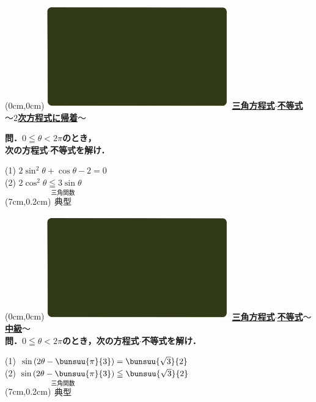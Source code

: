 \documentclass[10pt,
fleqn,
dvipdfmx,
uplatex
]{jsarticle}
\begin{document}
\at(0cm,0cm){\includegraphics[width=8cm,bb=0 0 1920 1080]{./youtube/thumbnails/templates/smart_background/三角関数.jpeg}}
{\color{orange}\bf\boldmath\normalsize\underline{三角方程式$\cdot$不等式$〜2$次方程式に帰着$〜$}}\vspace{0.3zw}

\large 
\bf\boldmath 問．$0\leqq \theta <2\pi$のとき，\\
\hfill 次の方程式$\cdot$不等式を解け．

\LARGE
(1)  $2\sin ^2\theta +\cos \theta -2=0$\\
(2)  $2\cos ^2\theta \leqq 3\sin \theta$\\

\at(7cm,0.2cm){\small\color{bradorange}$\overset{\text{三角関数}}{\text{典型}}$}

\newpage

\at(0cm,0cm){\includegraphics[width=8cm,bb=0 0 1920 1080]{./youtube/thumbnails/templates/smart_background/三角関数.jpeg}}
{\color{orange}\bf\boldmath\Large\underline{三角方程式$\cdot$不等式$〜$中級$〜$}}\vspace{0.3zw}\\
\small 
\bf\boldmath 問．$0\leqq \theta <2\pi$のとき，次の方程式$\cdot$不等式を解け．\vspace{0.5zw}

\Large 
(1)  $\sin \left(2\theta -\bunsuu{\pi }{3}\right)=\bunsuu{{\sqrt 3}}{2}$\\
(2)  $\sin \left(2\theta -\bunsuu{\pi }{3}\right)\leqq \bunsuu{{\sqrt 3}}{2}$\\

\at(7cm,0.2cm){\small\color{bradorange}$\overset{\text{三角関数}}{\text{典型}}$}
\end{document}
